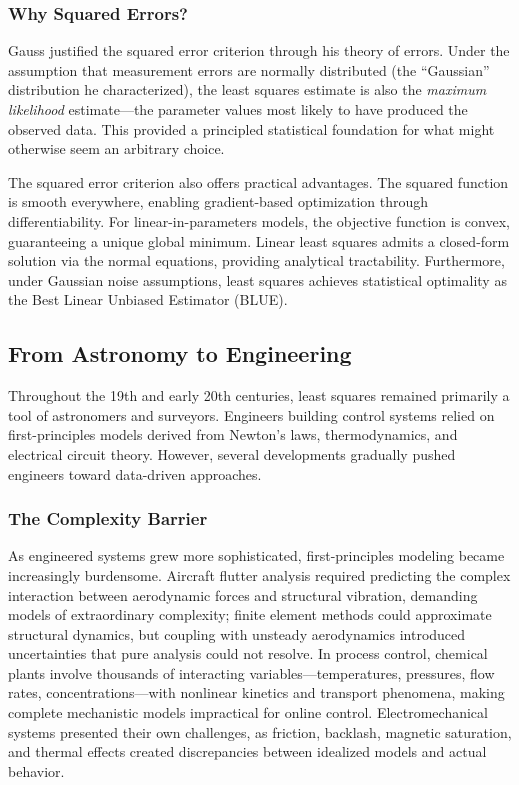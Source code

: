 \subsubsection{Why Squared Errors?}

Gauss justified the squared error criterion through his theory of errors. Under the assumption that measurement errors are normally distributed (the ``Gaussian'' distribution he characterized), the least squares estimate is also the \textit{maximum likelihood} estimate---the parameter values most likely to have produced the observed data. This provided a principled statistical foundation for what might otherwise seem an arbitrary choice.

The squared error criterion also offers practical advantages. The squared function is smooth everywhere, enabling gradient-based optimization through differentiability. For linear-in-parameters models, the objective function is convex, guaranteeing a unique global minimum. Linear least squares admits a closed-form solution via the normal equations, providing analytical tractability. Furthermore, under Gaussian noise assumptions, least squares achieves statistical optimality as the Best Linear Unbiased Estimator (BLUE).

\subsection{From Astronomy to Engineering}
\label{subsec:engineering_history}

Throughout the 19th and early 20th centuries, least squares remained primarily a tool of astronomers and surveyors. Engineers building control systems relied on first-principles models derived from Newton's laws, thermodynamics, and electrical circuit theory. However, several developments gradually pushed engineers toward data-driven approaches.

\subsubsection{The Complexity Barrier}

As engineered systems grew more sophisticated, first-principles modeling became increasingly burdensome. Aircraft flutter analysis required predicting the complex interaction between aerodynamic forces and structural vibration, demanding models of extraordinary complexity; finite element methods could approximate structural dynamics, but coupling with unsteady aerodynamics introduced uncertainties that pure analysis could not resolve. In process control, chemical plants involve thousands of interacting variables---temperatures, pressures, flow rates, concentrations---with nonlinear kinetics and transport phenomena, making complete mechanistic models impractical for online control. Electromechanical systems presented their own challenges, as friction, backlash, magnetic saturation, and thermal effects created discrepancies between idealized models and actual behavior.

